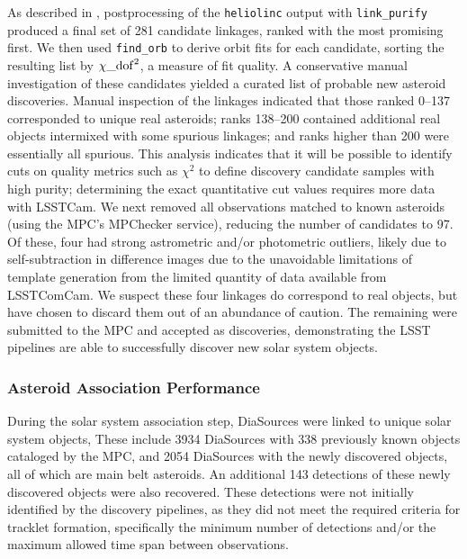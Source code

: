 As described in , postprocessing of the \texttt{heliolinc} output with \texttt{link\_purify} produced a final set of 281 candidate linkages, ranked with the most promising first.
We then used \texttt{find\_orb} \citep[][]{findorb} to derive orbit fits for each candidate, sorting the resulting list by $\chi\_{\rm dof}^2$, a measure of fit quality.
A conservative manual investigation of these candidates yielded a curated list of \nnewasteroiddiscoveries probable new asteroid discoveries.
Manual inspection of the linkages indicated that those ranked 0--137 corresponded to unique real asteroids; ranks 138--200 contained additional real objects intermixed with some spurious linkages; and ranks higher than 200 were essentially all spurious.
This analysis indicates that it will be possible to identify cuts on quality metrics such as $\chi^2$ to define discovery candidate samples with high purity; determining the exact quantitative cut values requires more data with \gls{LSSTCam}.
We next removed all observations matched to known asteroids (using the \gls{MPC}'s MPChecker service), reducing the number of candidates to 97.
Of these, four had strong astrometric and/or photometric outliers, likely due to self-subtraction in difference images due to the unavoidable limitations of template generation from the limited quantity of data available from  \gls{LSSTComCam}.
We suspect these four linkages do correspond to real objects, but have chosen to discard them out of an abundance of caution.
The remaining \nnewasteroiddiscoveries were submitted to the \gls{MPC} and accepted as  discoveries, demonstrating the \gls{LSST} pipelines are able to successfully discover new solar system objects.

\subsubsection{Asteroid Association Performance}
\label{ssec:asteroid_association}

During the solar system association step,  \nsolarsystemsources DiaSources were linked to \nsolarsystemobjects  unique solar system objects,
These include 3934 DiaSources with 338 previously known objects cataloged by the \gls{MPC}, and 2054 DiaSources with the \nnewasteroiddiscoveries  newly discovered objects, all of which are main belt asteroids.
An additional 143 detections of these newly discovered objects were also recovered.
These detections were not initially identified by the discovery pipelines, as they did not meet the required criteria for tracklet formation, specifically the minimum number of detections and/or the maximum allowed time span between observations.

